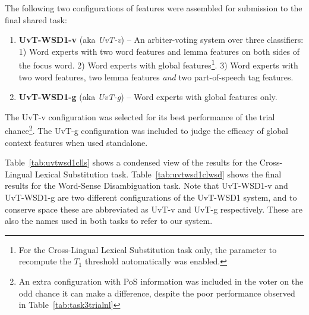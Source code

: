 
The following two configurations of features were assembled for submission to
the final shared task:

\begin{enumerate}
\item \textbf{UvT-WSD1-v} (aka \emph{UvT-v}) -- An arbiter-voting system over
three classifiers: 1) Word experts with two word features and lemma features on
both sides of the focus word. 2) Word experts with global features\footnote{For
the Cross-Lingual Lexical Substitution task only, the parameter to recompute
the $T_1$ threshold automatically was enabled.}. 3) Word experts with two word
features, two lemma features \emph{and} two part-of-speech tag features.
\item \textbf{UvT-WSD1-g} (aka \emph{UvT-g}) -- Word experts with global features
only.
\end{enumerate}

The UvT-v configuration was selected for its best performance of the trial
chance\footnote{An extra configuration with PoS information was included in the
voter on the odd chance it can make a difference, despite the poor performance
observed in Table~\ref{tab:task3trialnl}}. The UvT-g configuration was included
to judge the efficacy of global context features when used standalone.

Table~\ref{tab:uvtwsd1clls} shows a condensed view of the results for the Cross-Lingual Lexical
Substitution task. Table~\ref{tab:uvtwsd1clwsd} shows the final results for the Word-Sense
Disambiguation task. Note that UvT-WSD1-v and UvT-WSD1-g are two different
configurations of the UvT-WSD1 system, and to conserve space these are
abbreviated as UvT-v and UvT-g respectively. These are also the names used in
both tasks \citep{WSD,CLLS} to refer to our system.


